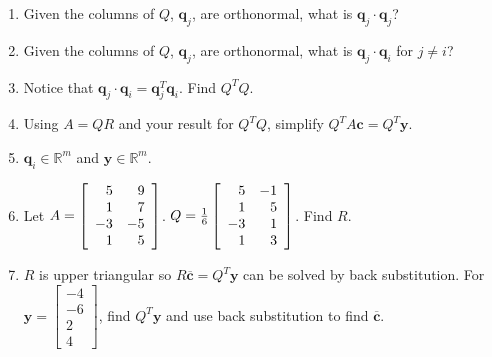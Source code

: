 \documentclass[12pt,letterpaper,noanswers]{exam}
\begin{document}
\begin{enumerate}
  \item  Given the columns of $Q$, $\mathbf{q}_j$, are orthonormal, what is $\mathbf{q}_j\cdot \mathbf{q}_j$?
    \item  Given the columns of $Q$, $\mathbf{q}_j$, are orthonormal, what is $\mathbf{q}_j\cdot \mathbf{q}_i$ for $j\neq i$?
    \item Notice that $\mathbf{q}_j\cdot \mathbf{q}_i = \mathbf{q}_j^T\mathbf{q}_i$.  Find $Q^TQ$.
    \item Using $A = QR$ and your result for $Q^TQ$, simplify $Q^TA\mathbf{c} = Q^T \mathbf{y}$.

\item $\mathbf{q}_i \in \mathbb{R}^m$ and $\mathbf{y}\in\mathbb{R}^m$.  
    
    \item Let $A =\left[ \begin{array}{r r} 5 & 9 \\ 1 & 7 \\ -3 & -5 \\ 1 & 5\end{array}\right]$.  $Q =\frac{1}{6}\left[ \begin{array}{r r} 5 & -1 \\ 1 & 5 \\ -3 & 1 \\ 1 & 3\end{array}\right]$.  Find $R$.
    
    \item $R$ is upper triangular so $R\overline{\mathbf{c}} = Q^T\mathbf{y}$ can be solved by back substitution.  For $\mathbf{y} = \left[\begin{array}{r} -4 \\ -6 \\ 2 \\ 4  \end{array}\right]$, find $Q^T\mathbf{y}$ and use back substitution to find $\overline{\mathbf{c}}$.
\end{enumerate}
\end{document}
